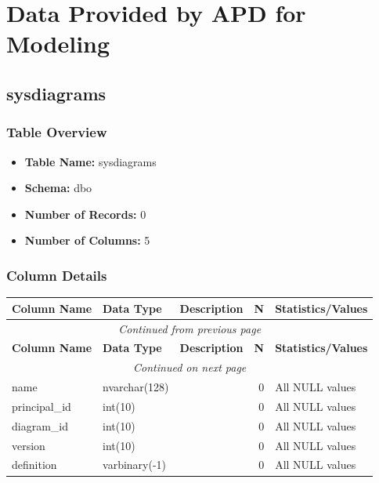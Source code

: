 \section{Data Provided by APD for Modeling}
\begin{landscape}

\subsection{sysdiagrams}

\subsubsection{Table Overview}
\begin{itemize}
\item \textbf{Table Name:} sysdiagrams
\item \textbf{Schema:} dbo
\item \textbf{Number of Records:} 0
\item \textbf{Number of Columns:} 5
\end{itemize}

\subsubsection{Column Details}
\begin{longtable}{|l|l|l|r|p{6cm}|}
\hline
\textbf{Column Name} & \textbf{Data Type} & \textbf{Description} & \textbf{N} & \textbf{Statistics/Values} \\
\hline
\endfirsthead
\multicolumn{5}{c}{\textit{Continued from previous page}} \\
\hline
\textbf{Column Name} & \textbf{Data Type} & \textbf{Description} & \textbf{N} & \textbf{Statistics/Values} \\
\hline
\endhead
\hline
\multicolumn{5}{c}{\textit{Continued on next page}} \\
\endfoot
\hline
\endlastfoot
name & nvarchar(128) &  & 0 & All NULL values \\
\hline
principal\_id & int(10) &  & 0 & All NULL values \\
\hline
diagram\_id & int(10) &  & 0 & All NULL values \\
\hline
version & int(10) &  & 0 & All NULL values \\
\hline
definition & varbinary(-1) &  & 0 & All NULL values \\
\hline
\end{longtable}


\end{landscape}

